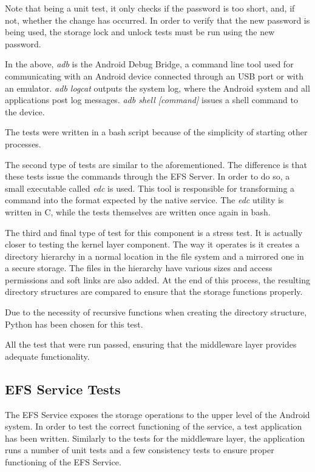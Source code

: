Note that being a unit test, it only checks if the password is too short, and, if not, whether the change has occurred. In order to verify that the new password is being used, the storage lock and unlock tests must be run using the new password.

In the above, \textit{adb} is the Android Debug Bridge, a command line tool used for communicating with an Android device connected through an USB port or with an emulator. \textit{adb logcat} outputs the system log, where the Android system and all applications post log messages. \textit{adb shell [command]} issues a shell command to the device.

The tests were written in a bash script because of the simplicity of starting other processes.

The second type of tests are similar to the aforementioned. The difference is that these tests issue the commands through the EFS Server. In order to do so, a small executable called \textit{edc} is used. This tool is responsible for transforming a command into the format expected by the native service. The \textit{edc} utility is written in C, while the tests themselves are written once again in bash.

The third and final type of test for this component is a stress test. It is actually closer to testing the kernel layer component. The way it operates is it creates a directory hierarchy in a normal location in the file system and a mirrored one in a secure storage. The files in the hierarchy have various sizes and access permissions and soft links are also added. At the end of this process, the resulting directory structures are compared to ensure that the storage functions properly.

Due to the necessity of recursive functions when creating the directory structure, Python has been chosen for this test.

All the test that were run passed, ensuring that the middleware layer provides adequate functionality.

\subsection{EFS Service Tests}
\label{sub-sec:efs-service-tests-eval}

The EFS Service exposes the storage operations to the upper level of the Android system. In order to test the correct functioning of the service, a test application has been written. Similarly to the tests for the middleware layer, the application runs a number of unit tests and a few consistency tests to ensure proper functioning of the EFS Service.


